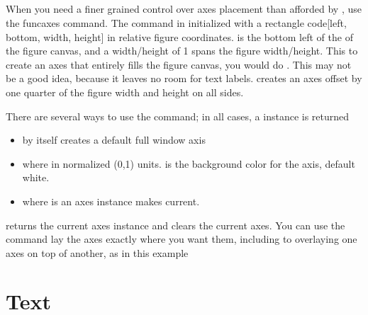 \documentclass[]{book}
\begin{document}


\subsection{}
\label{sec:axes}

When you need a finer grained control over axes placement than
afforded by , use the func{axes} command.  The
 command in initialized with a rectangle code{[left,
  bottom, width, height]} in relative figure coordinates.   is the bottom left of the of the figure canvas, and
a width/height of 1 spans the figure width/height.  This to create an
axes that entirely fills the figure canvas, you would do .  This may not be a good idea, because it leaves no room
for text labels.   creates an axes
offset by one quarter of the figure width and height on all sides.


There are several ways to use the  command; in all cases, a
 instance is returned

\begin{itemize}
\item {} by itself creates a default full
   window axis
  \item {} where  in normalized (0,1) units.   is the
    background color for the axis, default white.
  \item {} where  is an axes instance makes
   current.
\end{itemize}

\noindent {} returns the current axes instance and 
clears the current axes.  You can use the  command lay the
axes exactly where you want them, including to overlaying one axes on
top of another, as in this example





      
\section{Text}
\label{sec:text}
\end{document}
